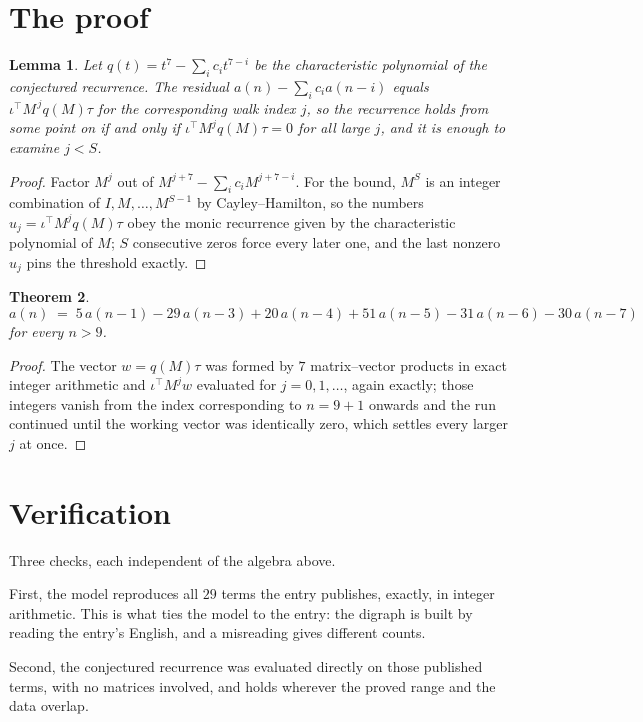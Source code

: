 \documentclass[11pt,a4paper]{article}
\theoremstyle{plain}
\newtheorem{theorem}{Theorem}
\newtheorem{lemma}[theorem]{Lemma}
\theoremstyle{definition}
\begin{document}
\section{The proof}

\begin{lemma}\label{lem:crit}
Let $q(t)=t^{7}-\sum_i c_it^{7-i}$ be the characteristic polynomial of the
conjectured recurrence. The residual $a(n)-\sum_ic_ia(n-i)$ equals
$\iota^{\!\top}M^{\,j}q(M)\tau$ for the corresponding walk index $j$, so the recurrence
holds from some point on if and only if $\iota^{\!\top}M^{j}q(M)\tau=0$ for all large $j$,
and it is enough to examine $j<S$.
\end{lemma}

\begin{proof}
Factor $M^{j}$ out of $M^{j+7}-\sum_ic_iM^{j+7-i}$. For the bound, $M^{S}$
is an integer combination of $I,M,\dots,M^{S-1}$ by Cayley--Hamilton, so the numbers
$u_j=\iota^{\!\top}M^{j}q(M)\tau$ obey the monic recurrence given by the characteristic
polynomial of $M$; $S$ consecutive zeros force every later one, and the last nonzero $u_j$
pins the threshold exactly.
\end{proof}

\begin{theorem}
\[
a(n)\;=\;5\,a(n-1) - 29\,a(n-3) + 20\,a(n-4) + 51\,a(n-5) - 31\,a(n-6) - 30\,a(n-7)
\]
for every $n>9$.
\end{theorem}

\begin{proof}
The vector $w=q(M)\tau$ was formed by $7$ matrix--vector products in exact integer
arithmetic and $\iota^{\!\top}M^{j}w$ evaluated for $j=0,1,\dots$, again exactly; those
integers vanish from the index corresponding to $n=9+1$ onwards and the run continued
until the working vector was identically zero, which settles every larger $j$ at once.
\end{proof}

\section{Verification}

Three checks, each independent of the algebra above.

First, the model reproduces all $29$ terms the entry publishes, exactly, in integer
arithmetic. This is what ties the model to the entry: the digraph is built by reading the
entry's English, and a misreading gives different counts.

Second, the conjectured recurrence was evaluated directly on those published terms, with no
matrices involved, and holds wherever the proved range and the data overlap.
\end{document}
